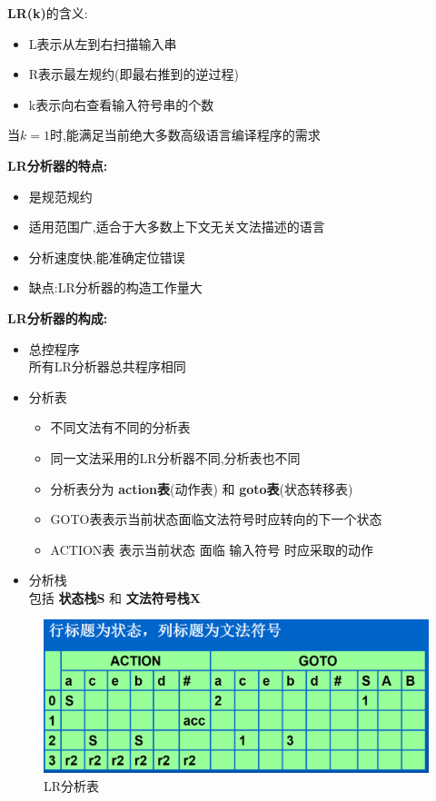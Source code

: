 \documentclass[UTF8,a4paper]{ctexart}
\begin{document}
 \textbf{LR(k)}的含义:
 \begin{itemize}
  \item L表示从左到右扫描输入串
  \item R表示最左规约(即最右推到的逆过程)
  \item k表示向右查看输入符号串的个数
 \end{itemize}

 当$k=1$时,能满足当前绝大多数高级语言编译程序的需求

 \textbf{LR分析器的特点:}
 \begin{itemize}
  \item 是规范规约
  \item 适用范围广,适合于大多数上下文无关文法描述的语言
  \item 分析速度快,能准确定位错误
  \item 缺点:LR分析器的构造工作量大
 \end{itemize}

 \textbf{LR分析器的构成:}
 \begin{itemize}
  \item 总控程序\\
        所有LR分析器总共程序相同
  \item 分析表
        \begin{itemize}
         \item 不同文法有不同的分析表
         \item 同一文法采用的LR分析器不同,分析表也不同
         \item 分析表分为 \textbf{action表}(动作表) 和 \textbf{goto表}(状态转移表)
         \item GOTO表表示当前状态面临文法符号时应转向的下一个状态
         \item ACTION表 表示当前状态 面临 输入符号 时应采取的动作
        \end{itemize}
  \item 分析栈\\
        包括 \textbf{状态栈S} 和 \textbf{文法符号栈X}
 \end{itemize}

 \begin{figure}[H]
  \centering
  \includegraphics[scale = 0.3]{assets/CompilerConstructionPrinciples_e8d30.png}
  \caption{LR分析表}
 \end{figure}
\end{document}
